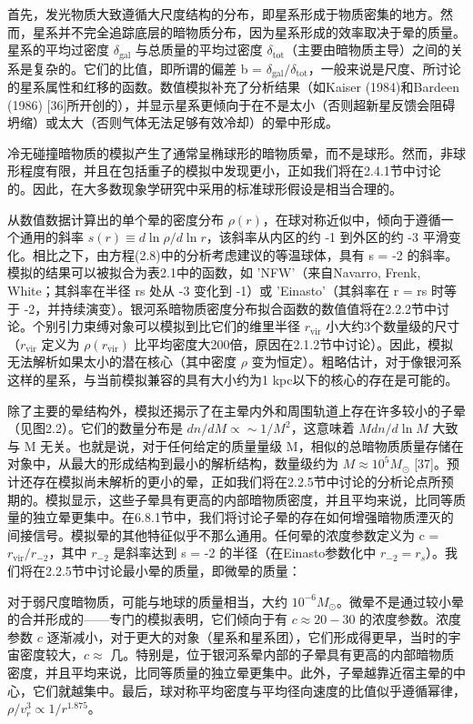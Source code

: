 首先，发光物质大致遵循大尺度结构的分布，即星系形成于物质密集的地方。然而，星系并不完全追踪底层的暗物质分布，因为星系形成的效率取决于晕的质量。星系的平均过密度 \( \delta_{\text{gal}} \) 与总质量的平均过密度 \( \delta_{\text{tot}} \)（主要由暗物质主导）之间的关系是复杂的。它们的比值，即所谓的偏差 b = \( \delta_{\text{gal}}/\delta_{\text{tot}} \)，一般来说是尺度、所讨论的星系属性和红移的函数。数值模拟补充了分析结果（如Kaiser (1984)和Bardeen (1986) [36]所开创的），并显示星系更倾向于在不是太小（否则超新星反馈会阻碍坍缩）或太大（否则气体无法足够有效冷却）的晕中形成。

冷无碰撞暗物质的模拟产生了通常呈椭球形的暗物质晕，而不是球形。然而，非球形程度有限，并且在包括重子的模拟中发现更小，正如我们将在2.4.1节中讨论的。因此，在大多数现象学研究中采用的标准球形假设是相当合理的。

从数值数据计算出的单个晕的密度分布 \( \rho(r) \)，在球对称近似中，倾向于遵循一个通用的斜率 \( s(r) \equiv d\ln\rho/d\ln r \)，该斜率从内区的约 -1 到外区的约 -3 平滑变化。相比之下，由方程(2.8)中的分析考虑建议的等温球体，具有 s = -2 的斜率。模拟的结果可以被拟合为表2.1中的函数，如 'NFW'（来自Navarro, Frenk, White；其斜率在半径 rs 处从 -3 变化到 -1）或 'Einasto'（其斜率在 r = rs 时等于 -2，并持续演变）。银河系暗物质密度分布拟合函数的数值值将在2.2.2节中讨论。个别引力束缚对象可以模拟到比它们的维里半径 \( r_{\text{vir}} \) 小大约3个数量级的尺寸（\( r_{\text{vir}} \) 定义为 \( \rho(r_{\text{vir}}) \) 比平均密度大200倍，原因在2.1.2节中讨论）。因此，模拟无法解析如果太小的潜在核心（其中密度 \( \rho \) 变为恒定）。粗略估计，对于像银河系这样的星系，与当前模拟兼容的具有大小约为1 kpc以下的核心的存在是可能的。

除了主要的晕结构外，模拟还揭示了在主晕内外和周围轨道上存在许多较小的子晕（见图2.2）。它们的数量分布是 \( dn/dM \propto \sim 1/M^2 \)，这意味着 \( M dn/d\ln M \) 大致与 M 无关。也就是说，对于任何给定的质量量级 M，相似的总暗物质质量存储在对象中，从最大的形成结构到最小的解析结构，数量级约为 \( M \approx 10^5 M_\odot \) [37]。预计还存在模拟尚未解析的更小的晕，正如我们将在2.2.5节中讨论的分析论点所预期的。模拟显示，这些子晕具有更高的内部暗物质密度，并且平均来说，比同等质量的独立晕更集中。在6.8.1节中，我们将讨论子晕的存在如何增强暗物质湮灭的间接信号。模拟晕的其他特征似乎不那么通用。任何晕的浓度参数定义为 c = \( r_{\text{vir}}/r_{-2} \)，其中 \( r_{-2} \) 是斜率达到 s = -2 的半径（在Einasto参数化中 \( r_{-2} = r_s \)）。我们将在2.2.5节中讨论最小晕的质量，即微晕的质量：

对于弱尺度暗物质，可能与地球的质量相当，大约 \(10^{-6} M_\odot\)。微晕不是通过较小晕的合并形成的——专门的模拟表明，它们倾向于有 \(c \approx 20 - 30\) 的浓度参数。浓度参数 \(c\) 逐渐减小，对于更大的对象（星系和星系团），它们形成得更早，当时的宇宙密度较大，\(c \approx\) 几。特别是，位于银河系晕内部的子晕具有更高的内部暗物质密度，并且平均来说，比同等质量的独立晕更集中。此外，子晕越靠近宿主晕的中心，它们就越集中。最后，球对称平均密度与平均径向速度的比值似乎遵循幂律，\(\rho/v^3_r \propto 1/r^{1.875}\)。

